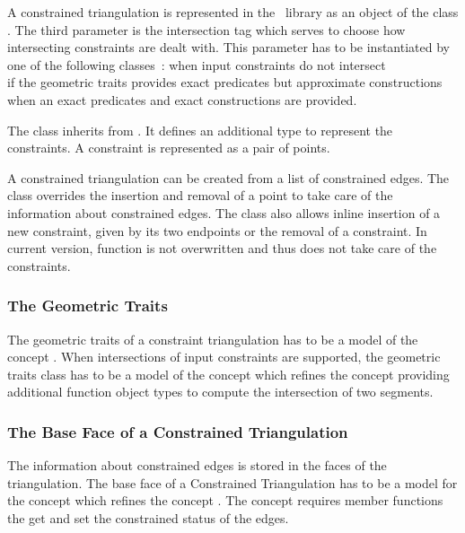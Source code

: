 A constrained triangulation is represented in the \cgal\ library as an
object of the class .
The third parameter  is the intersection tag
which serves to choose how intersecting constraints
are dealt with. This parameter has to be instantiated
by one of the following classes~:
 when input constraints do not
intersect \\
 if the geometric traits provides
exact predicates but approximate constructions \\
 when an exact predicates
and exact constructions are provided.

The class 
inherits from .
It defines an additional type 
to represent the constraints. A
constraint is represented as a pair of points.

A  constrained triangulation can be created
from a
list of constrained edges.
The class 
overrides the insertion and removal of a point to take care of the
information about constrained edges. The class also allows inline
insertion of a new constraint, given by its two endpoints
or the removal of a constraint.
In current version, function  is not 
overwritten and thus does not take care of the constraints.

\subsubsection{The Geometric Traits}
The geometric traits of a constraint triangulation
 has to be a model
of the concept .
When intersections of input constraints are supported, 
the geometric traits class has to be a model 
of the concept 
which refines the concept 
providing  additional function object types
to compute the intersection of two segments.

\subsubsection{The Base Face of a Constrained Triangulation}
 The information about constrained edges is stored in the 
faces of the triangulation. The base face of a Constrained Triangulation
has to be a model for the concept 
which refines the concept .
The concept 
requires  member functions
 the get and set the constrained status of the edges.

